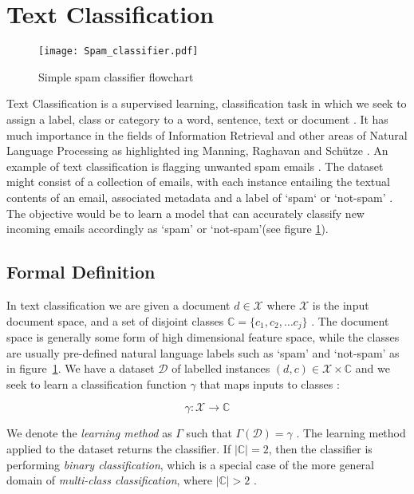 \documentclass[Dissertation.tex]{subfiles}
\begin{document}
\section{Text Classification}


\begin{figure}

	\centering
	\texttt{[image: Spam\_classifier.pdf]}
	\caption{Simple spam classifier flowchart}
	\label{spamClassifier}
\end{figure}
Text Classification is a supervised learning, classification task in which we seek to assign a label, class or category to a word, sentence, text or document \cite{jurafskySpeechLanguageProcessing}. It has much importance in the fields of Information Retrieval and other areas of Natural Language Processing  as highlighted ing Manning, Raghavan and Sch\"{u}tze \cite{manningIntroductionInformationRetrieval2009}.
An example of text classification is flagging unwanted spam emails \cite{geronHandsonMachineLearning2017}. The dataset might consist of a collection of emails, with each instance entailing the textual contents of an email, associated metadata and a label of `spam` or `not-spam' \cite{geronHandsonMachineLearning2017}. The objective would be to learn a model that can accurately classify new incoming emails accordingly as `spam' or `not-spam'(see figure \ref{spamClassifier}). 

\subsection{Formal Definition}
In text classification we are given a document $ d \in \mathcal{X}$ where $ \mathcal{X} $ is the input document space, and  a set of disjoint classes $ \mathbb{C} = \{c_1,c_2,\dots c_j\}$  \cite{manningIntroductionInformationRetrieval2009}. The document space is generally some form of high dimensional feature space, while the classes are usually pre-defined natural language labels such as `spam' and `not-spam' as in figure~\ref{spamClassifier}\cite{manningIntroductionInformationRetrieval2009}. We have a dataset $\mathcal{D}$ of labelled instances $(d,c) \in \mathcal{X}\times \mathbb{C}$ and we seek to learn a classification function $ \gamma $ that maps inputs to classes \cite{manningIntroductionInformationRetrieval2009}:

$$
\gamma: \mathcal{X}\rightarrow \mathbb{C}
$$

We denote the \textit{learning method} as $ \Gamma $ such that $ \Gamma(\mathcal{D})= \gamma $ \cite{manningIntroductionInformationRetrieval2009}. The learning method applied to the dataset returns the classifier.  If $ |\mathbb{C}| = 2 $, then the classifier is performing \textit{binary classification}, which is a special case of the more general domain of \textit{multi-class classification}, where $ |\mathbb{C}| > 2 $ \cite{manningIntroductionInformationRetrieval2009}.
\end{document}
